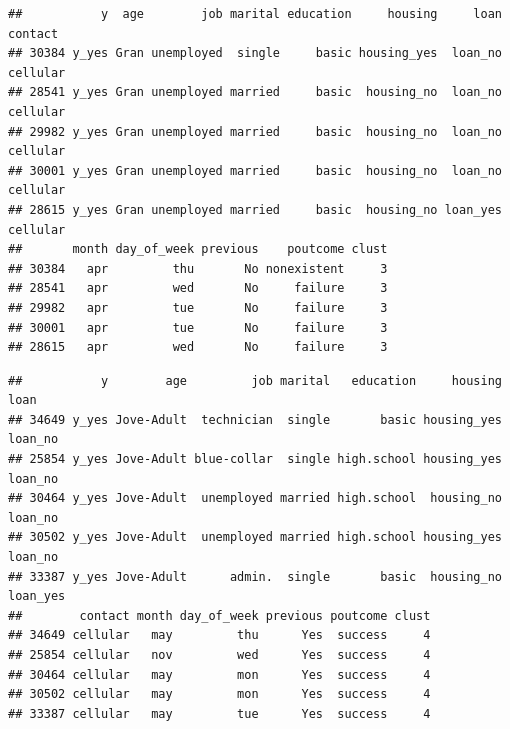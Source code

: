 \documentclass[
]{article}
\newenvironment{Shaded}{\begin{snugshade}}{\end{snugshade}}
\newcommand{\DecValTok}[1]{\textcolor[rgb]{0.00,0.00,0.81}{#1}}
\newcommand{\FunctionTok}[1]{\textcolor[rgb]{0.00,0.00,0.00}{#1}}
\newcommand{\NormalTok}[1]{#1}
\newcommand{\SpecialCharTok}[1]{\textcolor[rgb]{0.00,0.00,0.00}{#1}}
\begin{document}
\begin{Shaded}
\end{Shaded}

\begin{verbatim}
##           y  age        job marital education     housing     loan  contact
## 30384 y_yes Gran unemployed  single     basic housing_yes  loan_no cellular
## 28541 y_yes Gran unemployed married     basic  housing_no  loan_no cellular
## 29982 y_yes Gran unemployed married     basic  housing_no  loan_no cellular
## 30001 y_yes Gran unemployed married     basic  housing_no  loan_no cellular
## 28615 y_yes Gran unemployed married     basic  housing_no loan_yes cellular
##       month day_of_week previous    poutcome clust
## 30384   apr         thu       No nonexistent     3
## 28541   apr         wed       No     failure     3
## 29982   apr         tue       No     failure     3
## 30001   apr         tue       No     failure     3
## 28615   apr         wed       No     failure     3
\end{verbatim}

\begin{Shaded}
\end{Shaded}

\begin{verbatim}
##           y        age         job marital   education     housing     loan
## 34649 y_yes Jove-Adult  technician  single       basic housing_yes  loan_no
## 25854 y_yes Jove-Adult blue-collar  single high.school housing_yes  loan_no
## 30464 y_yes Jove-Adult  unemployed married high.school  housing_no  loan_no
## 30502 y_yes Jove-Adult  unemployed married high.school housing_yes  loan_no
## 33387 y_yes Jove-Adult      admin.  single       basic  housing_no loan_yes
##        contact month day_of_week previous poutcome clust
## 34649 cellular   may         thu      Yes  success     4
## 25854 cellular   nov         wed      Yes  success     4
## 30464 cellular   may         mon      Yes  success     4
## 30502 cellular   may         mon      Yes  success     4
## 33387 cellular   may         tue      Yes  success     4
\end{verbatim}
\end{document}
